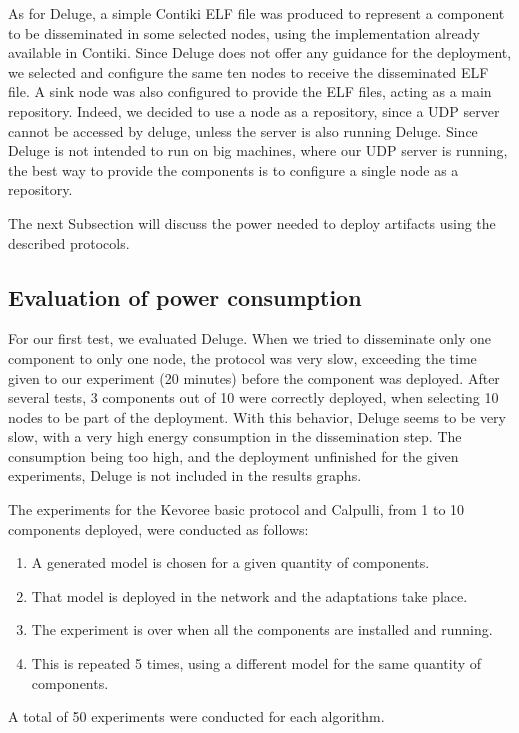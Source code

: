 As for Deluge,  a simple Contiki ELF file was produced to represent a component to be disseminated in some selected nodes, using the implementation already available in Contiki.
Since Deluge does not offer any guidance for the deployment, we selected and configure the same ten nodes to receive the disseminated ELF file.
A sink node was also configured to provide the ELF files, acting as a main repository.
Indeed, we decided to use a node as a repository, since a UDP server cannot be accessed by deluge, unless the server is also running Deluge.
Since Deluge is not intended to run on big machines, where our UDP server is running, the best way to provide the components is to configure a single node as a repository.

The next Subsection will discuss the power needed to deploy artifacts using the described protocols. 

\subsection{Evaluation of power consumption}
For our first test, we evaluated Deluge.
When we tried to disseminate only one component to only one node, the protocol was very slow, exceeding the time given to our experiment (20 minutes) before the component was deployed. After several tests, 3 components out of 10 were correctly deployed, when selecting 10 nodes to be part of the deployment.
With this behavior, Deluge seems to be very slow, with a very high energy consumption in the dissemination step. The consumption being too high, and the deployment unfinished for the given experiments, Deluge is not included in the results graphs.

The experiments for the Kevoree basic protocol and Calpulli, from 1 to 10 components deployed, were conducted as follows:
\begin{enumerate}
	\item A generated model is chosen for a given quantity of components.
	\item That model is deployed in the network and the adaptations take place.
	\item The experiment is over when all the components are installed and running.
	\item This is repeated 5 times, using a different model for the same quantity of components.
\end{enumerate}

A total of 50 experiments were conducted for each algorithm.


